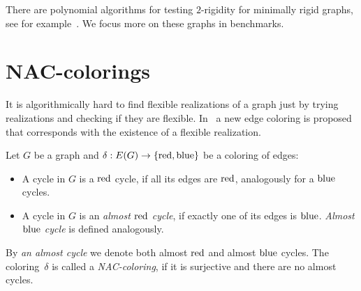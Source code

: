 

There are polynomial algorithms for testing \( 2 \)-rigidity
for minimally rigid graphs, see for example~\cite{polynomial-min-rigid}.
We focus more on these graphs in benchmarks.


\section{NAC-colorings}

It is algorithmically hard to find flexible realizations of a graph
just by trying realizations and checking if they are flexible.
In~\cite{legersky_original} a new edge coloring is proposed
that corresponds with the existence of a flexible realization.


\begin{definition}
	Let \( G \) be a graph and \( \delta: E(G) \to \{ \text{red}, \text{blue} \} \)
	be a coloring of edges:
	\begin{itemize}
		\item A cycle in \( G \) is a \( \text{red} \) cycle, if all its edges are \( \text{red} \),
		      analogously for a \( \text{blue} \) cycles.
		\item A cycle in \( G \) is an \emph{almost \( \text{red} \) cycle},
		      if exactly one of its edges is \( \text{blue} \).
		      \emph{Almost \( \text{blue} \) cycle} is defined analogously.
	\end{itemize}
	By \emph{an almost cycle} we denote both almost \( \text{red} \) and almost \( \text{blue} \) cycles.
	The coloring~\( \delta \) is called a \emph{NAC-coloring}, if it is surjective
	and there are no almost cycles.
\end{definition}
%

